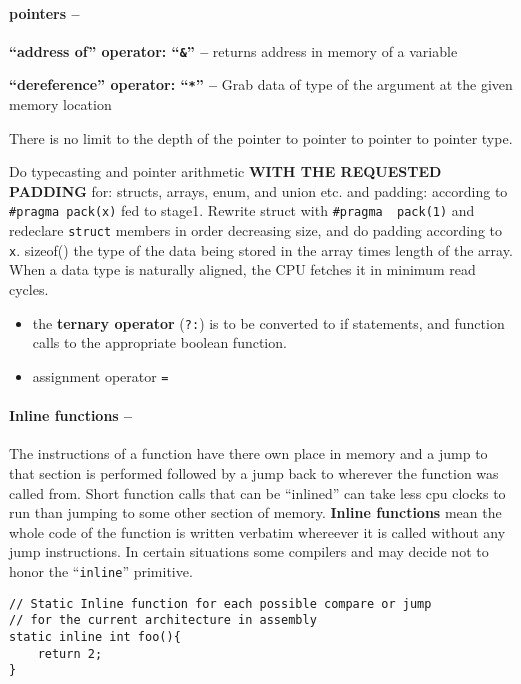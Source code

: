 \hypertarget{pointers}{%
\paragraph{pointers --}\label{pointers}}

\textbf{``address of'' operator: ``\texttt{\&}'' --} returns address in
memory of a variable

\textbf{``dereference'' operator: ``\texttt{*}'' --} Grab data of type
of the argument at the given memory location

There is no limit to the depth of the pointer to pointer to pointer to
pointer type.

Do typecasting and pointer arithmetic \textbf{WITH THE REQUESTED
PADDING} for: structs, arrays, enum, and union etc. and padding:
according to \texttt{\#pragma\ pack(x)} fed to stage1. Rewrite struct
with \texttt{\#pragma\ \ pack(1)} and redeclare \texttt{struct} members
in order decreasing size, and do padding according to \texttt{x}.
sizeof() the type of the data being stored in the array times length of
the array. When a data type is naturally aligned, the CPU fetches it in
minimum read cycles.

\begin{itemize}
\tightlist
\item
  the \textbf{ternary operator} (\texttt{?:}) is to be converted to if
  statements, and function calls to the appropriate boolean function.
\item
  assignment operator \texttt{=}
\end{itemize}

\hypertarget{inline-functions}{%
\paragraph{Inline functions --}\label{inline-functions}}

The instructions of a function have there own place in memory and a jump
to that section is performed followed by a jump back to wherever the
function was called from. Short function calls that can be ``inlined''
can take less cpu clocks to run than jumping to some other section of
memory. \textbf{Inline functions} mean the whole code of the function is
written verbatim whereever it is called without any jump instructions.
In certain situations some compilers and may decide not to honor the
``\texttt{inline}'' primitive.

\begin{verbatim}
// Static Inline function for each possible compare or jump
// for the current architecture in assembly
static inline int foo(){
    return 2;
}
\end{verbatim}

